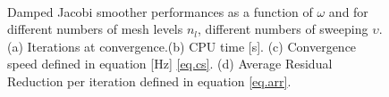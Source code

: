   \begin{figure}[hbt!]
   \centering
        \\
        \caption{Damped Jacobi smoother performances as a function of $\omega$ and for different numbers of mesh levels $n_l$, different numbers of sweeping $\upsilon$. (a) Iterations at convergence.(b) CPU time [s]. (c) Convergence speed defined in equation [Hz] \eqref{eq.cs}. (d) Average Residual Reduction per iteration defined in equation \eqref{eq.arr}. }
        \label{f.1.32}
      \end{figure} 
